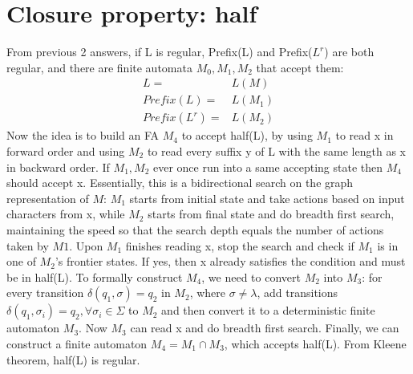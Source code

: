 \documentclass{article}
\begin{document}
\section{Closure property: half}
From previous 2 answers, if L is regular, Prefix(L) and Prefix($L^r$) are
both regular, and there are finite automata $M_0, M_1, M_2$ that accept
them:
\begin{align*}
L =& L(M)\\
Prefix(L) =& L(M_1)\\
Prefix(L^r) =& L(M_2)
\end{align*}
Now the idea is to build an FA $M_4$ to accept half(L), by using $M_1$ to read
x in forward order and using $M_2$ to read every suffix y of L with the same
length as x in backward order. If $M_1, M_2$ ever once run into a same accepting
state then $M_4$ should accept x. Essentially, this is a bidirectional search
on the graph representation of $M$: $M_1$ starts from initial state and
take actions based on input characters from x, while $M_2$ starts from final
state and do breadth first search, maintaining the speed so that the search
depth equals the number of actions taken by $M1$. Upon $M_1$ finishes reading x,
stop the search and check if $M_1$ is in one of $M_2$'s frontier states. If yes,
then x already satisfies the condition and must be in half(L). To formally
construct $M_4$, we need to convert $M_2$ into $M_3$: for every transition
$\delta(q_1, \sigma) = q_2$ in $M_2$, where $\sigma \neq \lambda$, add
transitions $\delta(q_1, \sigma_i) = q_2, \forall \sigma_i \in \Sigma$ to $M_2$
and then convert it to a deterministic finite automaton $M_3$. Now $M_3$ can
read x and do breadth first search. Finally, we can construct a finite automaton
$M_4 = M_1 \cap M_3$, which accepts half(L). From Kleene theorem, half(L) is regular.
\end{document}
